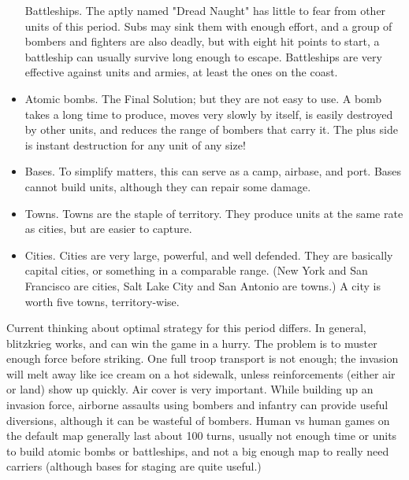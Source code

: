 \begin{itemize}
Battleships.  The aptly named "Dread Naught" has little to fear from other
units of this period.  Subs may sink them with enough effort, and a group
of bombers and fighters are also deadly, but with eight hit points to start,
a battleship can usually survive long enough to escape.
Battleships are very effective against units and armies, at least the
ones on the coast.
\item
Atomic bombs.  The Final Solution; but they are not easy to use.  A bomb
takes a long time to produce, moves very slowly by itself, is easily
destroyed by other units, and reduces the range of bombers that
carry it.
The plus side is instant destruction for any unit of any size!
\item
Bases.  To simplify matters, this can serve as a camp, airbase, and port.
Bases cannot build units, although they can repair some damage.
\item
Towns.  Towns are the staple of territory.  They produce units at the
same rate as cities, but are easier to capture.
\item
Cities.  Cities are very large, powerful, and well defended.  They are
basically capital cities, or something in a comparable range.  (New York
and San Francisco are cities, Salt Lake City and San Antonio are towns.)
A city is worth five towns, territory-wise.
\end{itemize}\par\noindent
Current thinking about optimal strategy for this period differs.  In general,
blitzkrieg works, and can win the game in a hurry.  The problem is to
muster enough force before striking.  One full troop transport is not
enough; the invasion will melt away like ice cream on a hot sidewalk, unless
reinforcements (either air or land) show up quickly.  Air cover is very
important.  While building up an invasion force, airborne assaults using
bombers and infantry can provide useful diversions, although it can be
wasteful of bombers.  Human vs human games on the default map generally
last about 100 turns, usually not enough time or units to build atomic
bombs or battleships, and not a big enough map to really need carriers
(although bases for staging are quite useful.)

